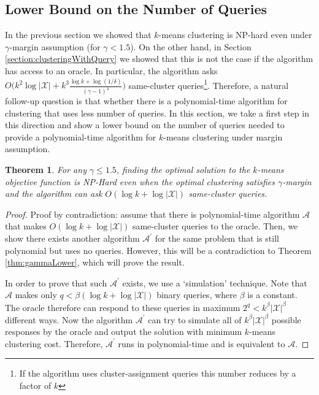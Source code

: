\documentclass{article}
\newcommand{\mc}{\mathcal}
\newtheorem{theorem}{Theorem}
\begin{document}
\subsection{Lower Bound on the Number of Queries}

In the previous section we showed that $k$-means clustering is NP-hard even under $\gamma$-margin assumption (for $\gamma < 1.5$). On the other hand, in Section \ref{section:clusteringWithQuery} we showed that this is not the case if the algorithm has access to an oracle. In particular, the algorithm asks $O\big(k^2\log |\mc X| + k^3\frac{\log k + \log (1/\delta)}{(\gamma - 1)^4}\big)$ same-cluster queries\footnote{If the algorithm uses cluster-assignment queries this number reduces by a factor of $k$}. Therefore, a natural follow-up question is that whether there is a polynomial-time algorithm for clustering that uses less number of queries. In this section, we take a first step in this direction and show a lower bound on the number of queries needed to provide a polynomial-time algorithm for $k$-means clustering under margin assumption.

\begin{theorem}
\label{thm:queryLower}
For any $\gamma \le 1.5$, finding the optimal solution to the $k$-means objective function is NP-Hard even when the optimal clustering satisfies $\gamma$-margin and the algorithm can ask $O(\log k + \log |\mc X|)$ same-cluster queries.
\end{theorem}
\begin{proof}
Proof by contradiction: assume that there is polynomial-time algorithm $\mc A$ that makes $O(\log k + \log |\mc X|)$ same-cluster queries to the oracle. Then, we show there exists another algorithm $\mc A^\prime$ for the same problem that is still polynomial but uses no queries. However, this will be a contradiction to Theorem \ref{thm:gammaLower}, which will prove the result.

In order to prove that such $\mc A^\prime$ exists, we use a `simulation' technique. Note that $\mc A$ makes only $q<\beta(\log k + \log |\mc X|)$ binary queries, where $\beta$ is a constant. The oracle therefore can respond to these queries in maximum $2^{q} < k^\beta|\mc X|^\beta$ different ways. Now the algorithm $\mc A^\prime$ can try to simulate all of $k^\beta|\mc X|^\beta$ possible responses by the oracle and output the solution with minimum $k$-means clustering cost. Therefore, $\mc A^\prime$ runs in polynomial-time and is equivalent to $\mc A$.
\end{proof}
\end{document}
